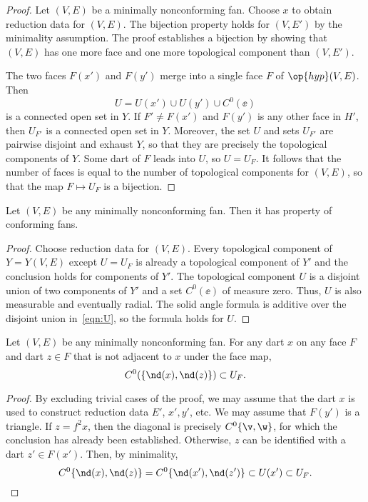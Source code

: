 \begin{proof} Let $(V,E)$ be a minimally nonconforming fan.  Choose
  $x$ to obtain reduction data for $(V,E)$.  The bijection property
  holds for $(V,E')$ by the minimality assumption.  The proof 
  establishes a bijection by showing that $(V,E)$ has one more face and
  one more topological component than $(V,E')$.

The
two faces $F(x')$ and $F(y')$ merge into a single face $F$ of
$\op{hyp}(V,E)$.  Then
\begin{equation}\label{eqn:U}
U= U(x')\cup U(y')\cup C^0(\ee)
\end{equation} 
is a connected open set in $Y$.  If $F'\ne F(x')$ and $F(y')$ is any other
face in $H'$, then $U_{F'}$ is a connected open set in $Y$.  Moreover,
the set $U$ and sets $U_{F'}$ are pairwise disjoint and exhaust $Y$,
so that they are precisely the topological components of $Y$.  Some
dart of $F$ leads into $U$, so $U=U_F$. 
It follows that the number of
faces is equal to the number of topological components for $(V,E)$, so that the
map $F\mapsto U_F$ is a bijection.
\end{proof}


\begin{lemma}[]\cutrate{} Let $(V,E)$ be any minimally
nonconforming fan.  Then it has property  of
conforming fans.
\end{lemma}

\begin{proof} Choose reduction data for $(V,E)$.  Every topological
component of $Y=Y(V,E)$ except $U=U_F$ is already a topological
component of $Y'$ and the conclusion holds for components of $Y'$.
The topological component $U$ is a disjoint union of two components
of $Y'$ and a set $C^0(\ee)$ of measure zero.  Thus, $U$ is also
measurable and eventually radial.  The solid angle formula is
additive over the disjoint union in~\eqref{eqn:U}, so the formula
holds for $U$.
\end{proof}
%


\begin{lemma}[]\cutrate{} Let $(V,E)$ be any minimally
nonconforming fan.  For any dart $x$ on any face $F$ and dart $z\in
F$ that is not adjacent to $x$ under the face map,
\[ 
C^0(\{\nd(x),\nd(z)\}) \subset U_F.
\] 
\end{lemma}

\begin{proof}  
  By excluding trivial cases of the proof, we may assume that the dart $x$ 
  is used to construct reduction data $E'$, $x',y'$, etc. We may
  assume that $F(y')$ is a triangle.  If $z=f^2x$, then the diagonal
  is precisely $C^0\{\v,\w\}$, for which the conclusion has already
  been established.  Otherwise, $z$ can be identified with a dart
  $z'\in F(x')$.  Then, by minimality,
\[ 
C^0\{\nd(x),\nd(z)\} = C^0\{\nd(x'),\nd(z')\} \subset U(x') \subset U_F.
\] 
\end{proof}

